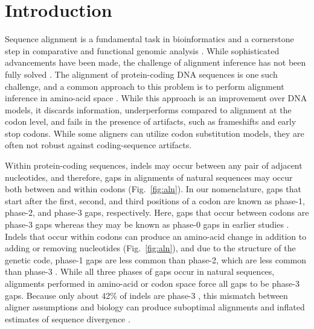 \documentclass[12pt,letterpaper]{article}
\begin{document}

\linenumbers

\section*{Introduction}

Sequence alignment is a fundamental task in bioinformatics and a cornerstone step in comparative and functional genomic analysis \citep{sequence_alignment_rosenberg_2009}. While sophisticated advancements have been made, the challenge of alignment inference has not been fully solved \citep{art_morrison_2015}.
The alignment of protein-coding DNA sequences is one such challenge, and a common approach to this problem is to perform alignment inference in amino-acid space \citep[e.g.][]{bininda2005transalign,abascal2010translatorx}. While this approach is an improvement over DNA models, it discards information, underperforms compared to alignment at the codon level, and fails in the presence of artifacts, such as frameshifts and early stop codons. While some aligners can utilize codon substitution models, they are often not robust against coding-sequence artifacts.

Within protein-coding sequences, indels may occur between any pair of adjacent nucleotides, and therefore, gaps in alignments of natural sequences may occur both between and within codons (Fig.\ \ref{fig:aln}). In our nomenclature, gaps that start after the first, second, and third positions of a codon are known as phase-1, phase-2, and phase-3 gaps, respectively. Here, gaps that occur between codons are phase-3 gaps whereas they may be known as phase-0 gaps in earlier studies \cite[e.g.][]{taylor2004occurrence}. Indels that occur within codons can produce an amino-acid change in addition to adding or removing nucleotides (Fig.\ \ref{fig:aln}), and due to the structure of the genetic code, phase-1 gaps are less common than phase-2, which are less common than phase-3 \citep{taylor2004occurrence, zhu2022profiling}. While all three phases of gaps occur in natural sequences, alignments performed in amino-acid or codon space force all gaps to be phase-3 gaps. Because only about 42\% of indels are phase-3 \citep{taylor2004occurrence, zhu2022profiling}, this mismatch between aligner assumptions and biology can produce suboptimal alignments and inflated estimates of sequence divergence
\citep[Fig.\ \ref{fig:aln};][]{redelings2007incorporating}.
\end{document}
